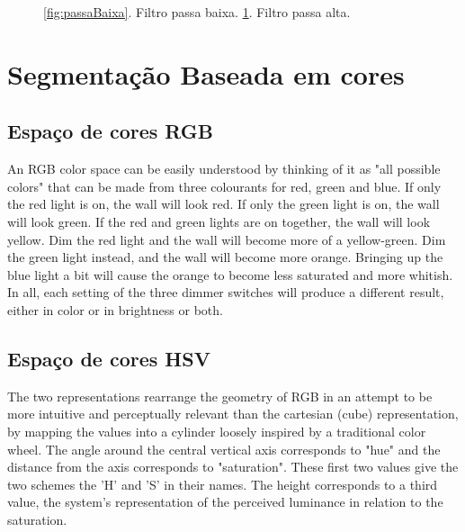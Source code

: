 \documentclass[
	article,			%
	11pt,				%
	oneside,			%
	a4paper,			%
	english,			%
	brazil,				%
	sumario=tradicional
	]{abntex2}
\begin{document}
\begin{figure}
\begin{subfigure}[b]{0.3\textwidth}
                \caption{}
                \label{fig:passaAlta}
        \end{subfigure}      
       
       
       
        \caption{ 
        \ref{fig:passaBaixa}. Filtro passa baixa.
        \ref{fig:passaAlta}. Filtro passa alta.
        }
	\label{fig:filtrosFrequencia}
\end{figure}

\section{Segmentação Baseada em cores}

\subsection{Espaço de cores RGB}
An RGB color space can be easily understood by thinking of it as "all possible
colors" that can be made from three colourants for red, green and blue. If only
the red light is on, the wall will look red. If only the green light is on, the
wall will look green. If the red and green lights are on together, the wall will
look yellow. Dim the red light and the wall will become more of a yellow-green.
Dim the green light instead, and the wall will become more orange. Bringing up
the blue light a bit will cause the orange to become less saturated and more
whitish. In all, each setting of the three dimmer switches will produce a
different result, either in color or in brightness or both.

\subsection{Espaço de cores HSV}

The two representations rearrange the geometry of RGB in an attempt to be more
intuitive and perceptually relevant than the cartesian (cube) representation, by
mapping the values into a cylinder loosely inspired by a traditional color
wheel. The angle around the central vertical axis corresponds to "hue" and the
distance from the axis corresponds to "saturation". These first two values give
the two schemes the 'H' and 'S' in their names. The height corresponds to a
third value, the system's representation of the perceived luminance in relation
to the saturation.
\end{document}

